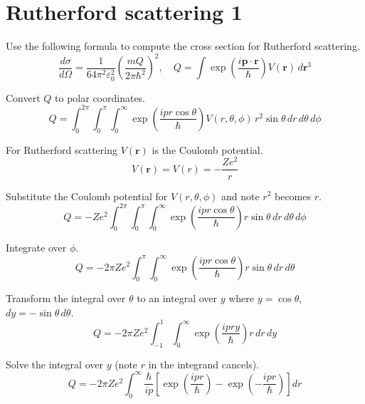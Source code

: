 


\section*{Rutherford scattering 1}

Use the following formula to compute the cross section for Rutherford scattering.
\begin{equation*}
\frac{d\sigma}{d\Omega}=\frac{1}{64\pi^2\varepsilon_0^2}\left(\frac{mQ}{2\pi\hbar^2}\right)^2,\quad
Q=\int\exp\left(\frac{i\mathbf p\cdot\mathbf r}{\hbar}\right)V(\mathbf r)\,d\mathbf r^3
\end{equation*}

Convert $Q$ to polar coordinates.
\begin{equation*}
Q=\int_0^{2\pi}
\int_0^\pi
\int_0^\infty
\exp\left(\frac{ipr\cos\theta}{\hbar}\right)V(r,\theta,\phi)
\,r^2\sin\theta\,dr\,d\theta\,d\phi
\end{equation*}

For Rutherford scattering $V(\mathbf r)$ is the Coulomb potential.
\begin{equation*}
V(\mathbf r)=V(r)=-\frac{Ze^2}{r}
\end{equation*}

Substitute the Coulomb potential for $V(r,\theta,\phi)$ and note $r^2$ becomes $r$.
\begin{equation*}
Q=-Ze^2
\int_0^{2\pi}
\int_0^\pi
\int_0^\infty
\exp\left(\frac{ipr\cos\theta}{\hbar}\right)
r\sin\theta\,dr\,d\theta\,d\phi
\end{equation*}

Integrate over $\phi$.
\begin{equation*}
Q=-2\pi Ze^2
\int_0^\pi
\int_0^\infty
\exp\left(\frac{ipr\cos\theta}{\hbar}\right)
r\sin\theta\,dr\,d\theta
\end{equation*}

Transform the integral over $\theta$ to an integral over $y$
where $y=\cos\theta$, $dy=-\sin\theta\,d\theta$.
\begin{equation*}
Q=-2\pi Ze^2
\int_{-1}^1
\int_0^\infty
\exp\left(\frac{ipry}{\hbar}\right)
r\,dr\,dy
\end{equation*}

Solve the integral over $y$ (note $r$ in the integrand cancels).
\begin{equation*}
Q=-2\pi Ze^2
\int_0^\infty
\frac{\hbar}{ip}
\left[\exp\left(\frac{ipr}{\hbar}\right)-\exp\left(-\frac{ipr}{\hbar}\right)\right]
dr
\end{equation*}

